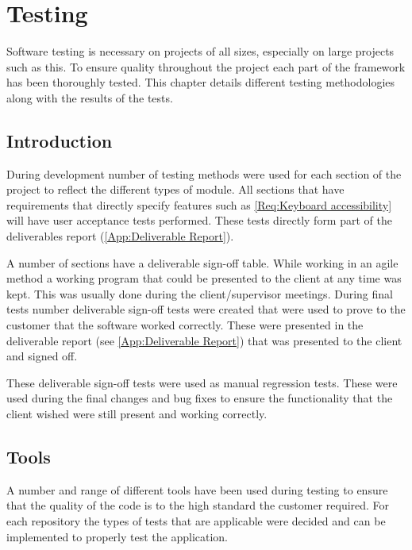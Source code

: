 
\chapter{Testing} \label{Chapter: Testing}

\begin{preamble}
Software testing is necessary on projects of all sizes, especially on large projects such as this. To ensure quality throughout the project each part of the framework has been thoroughly tested. This chapter details different testing methodologies along with the results of the tests.
\end{preamble}

\section{Introduction}

During development number of testing methods were used for each section of the project to reflect the different types of module. All sections that have requirements that directly specify features such as \cref{Req:Keyboard accessibility} will have user acceptance tests performed. These tests directly form part of the deliverables report (\cref{App:Deliverable Report}).

A number of sections have a deliverable sign-off table. While working in an agile method a working program that could be presented to the client at any time was kept. This was usually done during the client/supervisor meetings. During final tests number deliverable sign-off tests were created that were used to prove to the customer that the software worked correctly. These were presented in the deliverable report (see \cref{App:Deliverable Report}) that was presented to the client and signed off.

These deliverable sign-off tests were used as manual regression tests. These were used during the final changes and bug fixes to ensure the functionality that the client wished were still present and working correctly.

\section{Tools}

A number and range of different tools have been used during testing to ensure that the quality of the code is to the high standard the customer required. For each repository the types of tests that are applicable were decided and can be implemented to properly test the application.

